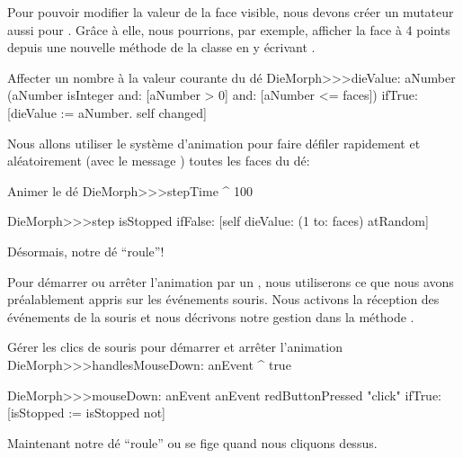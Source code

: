 \documentclass[a4paper,10pt,twoside]{book}
\begin{document}
Pour pouvoir modifier la valeur de la face visible, nous devons
créer un mutateur aussi pour . 
Grâce à elle, nous pourrions, par exemple, afficher la face à 4
points depuis une nouvelle méthode de la classe en y écrivant
.

\begin{method}{Affecter un nombre à la valeur courante du dé}
DieMorph>>>dieValue: aNumber
	(aNumber isInteger
			and: [aNumber > 0]
			and: [aNumber <= faces])
		ifTrue:
			[dieValue := aNumber.
			self changed]
\end{method}

Nous allons utiliser le système d'animation pour faire défiler rapidement 
et aléatoirement (avec le message ) toutes les faces du dé:
\begin{methods}{Animer le dé}
DieMorph>>>stepTime
	^ 100

DieMorph>>>step
	isStopped ifFalse: [self dieValue: (1 to: faces) atRandom]
\end{methods}
Désormais, notre dé ``roule''!

Pour démarrer ou arrêter  l'animation par un , nous
utiliserons ce que nous avons préalablement appris sur les événements souris.
Nous activons la réception des événements de la souris et nous
décrivons notre gestion  dans la
méthode .       

\begin{methods}{Gérer les clics de souris pour démarrer et arrêter l'animation}
DieMorph>>>handlesMouseDown: anEvent
	^ true

DieMorph>>>mouseDown: anEvent
	anEvent redButtonPressed "click"
		ifTrue: [isStopped := isStopped not]
\end{methods}

Maintenant notre dé ``roule'' ou se fige quand nous cliquons dessus.



\end{document}
